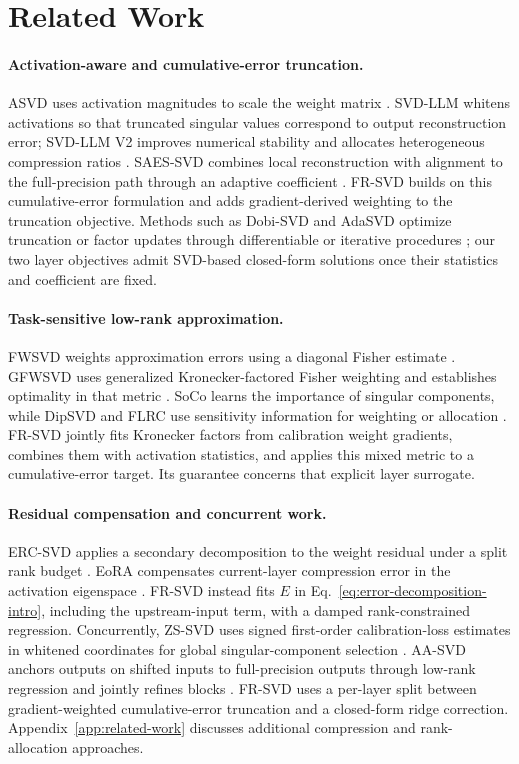 \documentclass[11pt]{article}
\begin{document}
\section{Related Work}\label{sec:related-work}

\paragraph{Activation-aware and cumulative-error truncation.}
ASVD uses activation magnitudes to scale the weight matrix \citep{yuan2023asvd}. SVD-LLM whitens activations so that truncated singular values correspond to output reconstruction error; SVD-LLM V2 improves numerical stability and allocates heterogeneous compression ratios \citep{wang2025svdllm,wang2025svdllmv2}. SAES-SVD combines local reconstruction with alignment to the full-precision path through an adaptive coefficient \citep{hu2026saessvd}. FR-SVD builds on this cumulative-error formulation and adds gradient-derived weighting to the truncation objective. Methods such as Dobi-SVD and AdaSVD optimize truncation or factor updates through differentiable or iterative procedures \citep{wang2025dobisvd,li2025adasvd}; our two layer objectives admit SVD-based closed-form solutions once their statistics and coefficient are fixed.

\paragraph{Task-sensitive low-rank approximation.}
FWSVD weights approximation errors using a diagonal Fisher estimate \citep{hsu2022fwsvd}. GFWSVD uses generalized Kronecker-factored Fisher weighting and establishes optimality in that metric \citep{chekalina2025gfwsvd}. SoCo learns the importance of singular components, while DipSVD and FLRC use sensitivity information for weighting or allocation \citep{li2025soco,ding2025dipsvd,lu2025flrc}. FR-SVD jointly fits Kronecker factors from calibration weight gradients, combines them with activation statistics, and applies this mixed metric to a cumulative-error target. Its guarantee concerns that explicit layer surrogate.

\paragraph{Residual compensation and concurrent work.}
ERC-SVD applies a secondary decomposition to the weight residual under a split rank budget \citep{bai2025ercsvd}. EoRA compensates current-layer compression error in the activation eigenspace \citep{liu2025eora}. FR-SVD instead fits $E$ in Eq.~\eqref{eq:error-decomposition-intro}, including the upstream-input term, with a damped rank-constrained regression. Concurrently, ZS-SVD uses signed first-order calibration-loss estimates in whitened coordinates for global singular-component selection \citep{abbasi2026zssvd}. AA-SVD anchors outputs on shifted inputs to full-precision outputs through low-rank regression and jointly refines blocks \citep{sinha2026aasvd}. FR-SVD uses a per-layer split between gradient-weighted cumulative-error truncation and a closed-form ridge correction. Appendix~\ref{app:related-work} discusses additional compression and rank-allocation approaches.
\end{document}
